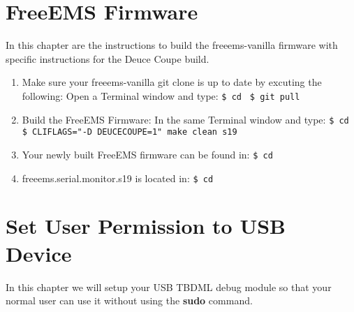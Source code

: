 \documentclass[12pt,notitlepage,onecolumn,oneside,openany]{memoir}
\begin{document}
\chapter{\textsf{FreeEMS Firmware}}

\textsf{In this chapter are the instructions to build the freeems-vanilla firmware with specific instructions for the Deuce Coupe build.} \newline

\begin{enumerate}
\item \textsf{Make sure your freeems-vanilla git clone is up to date by excuting the following:} \newline
      \textsf{Open a Terminal window and type:} \newline
      \texttt{\$ cd }  \newline
      \texttt{\$ git pull}

\item \textsf{Build the FreeEMS Firmware:} \newline
      \textsf{In the same Terminal window and type:} \newline
      \texttt{\$ cd }  \newline
      \texttt{\$ CLIFLAGS="-D DEUCECOUPE=1" make clean s19}

\item \textsf{Your newly built FreeEMS firmware can be found in:} \newline
      \texttt{\$ cd } 

\item \textsf{freeems.serial.monitor.s19 is located in:} \newline
      \texttt{\$ cd } 
\end{enumerate}

\chapter{\textsf{Set User Permission to USB Device}}

\textsf{In this chapter we will setup your USB TBDML debug module so that your normal user can use it without using the \textbf{sudo} command.} \newline
\end{document}
